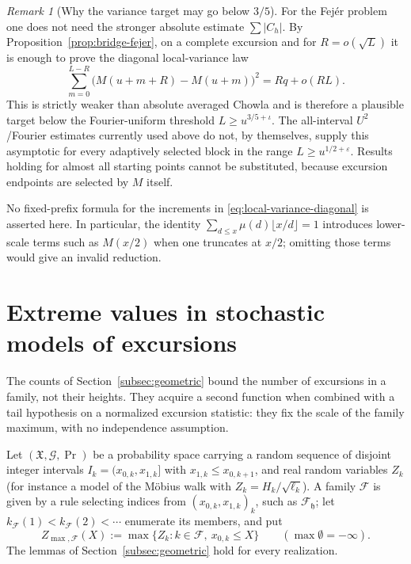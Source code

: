 \documentclass[11pt]{amsart}
\numberwithin{equation}{section}
\theoremstyle{plain}
\theoremstyle{definition}
\theoremstyle{remark}
\newtheorem{remark}[theorem]{Remark}
\newcommand{\eps}{\varepsilon}
\newcommand{\F}{\mathcal{F}}
\begin{document}
\begin{remark}[Why the variance target may go below $3/5$]
\label{rem:variance-target}
For the Fej\'er problem one does not need the stronger absolute estimate
$\sum|C_h|$. By Proposition~\ref{prop:bridge-fejer}, on a complete excursion
and for $R=o(\sqrt L)$ it is enough to prove the diagonal local-variance law
\[
\sum_{m=0}^{L-R}\bigl(M(u+m+R)-M(u+m)\bigr)^2
=Rq+o(RL).
\]
This is strictly weaker than absolute averaged Chowla and is therefore a
plausible target below the Fourier-uniform threshold $L\ge u^{3/5+\iota}$.
The all-interval $U^2$/Fourier estimates currently used above do not, by
themselves, supply this asymptotic for every adaptively selected block in
the range $L\ge u^{1/2+\eps}$. Results holding for almost all starting
points cannot be substituted, because excursion endpoints are selected by
$M$ itself.

No fixed-prefix formula for the increments in
\eqref{eq:local-variance-diagonal} is asserted here. In particular, the
identity $\sum_{d\le x}\mu(d)\lfloor x/d\rfloor=1$ introduces lower-scale
terms such as $M(x/2)$ when one truncates at $x/2$; omitting those terms
would give an invalid reduction.
\end{remark}



\section{Extreme values in stochastic models of excursions}
\label{sec:extreme}
\label{subsec:extreme}

The counts of Section~\ref{subsec:geometric} bound the number of excursions
in a family, not their heights. They acquire a second function when combined
with a tail hypothesis on a normalized excursion statistic: they fix the
scale of the family maximum, with no independence assumption.

Let $(\mathfrak X,\mathcal G,\Pr)$ be a probability space carrying a random
sequence of disjoint integer intervals $I_k=(x_{0,k},x_{1,k}]$ with
$x_{1,k}\le x_{0,k+1}$, and real random variables $Z_k$ (for instance a model
of the M\"obius walk with $Z_k=H_k/\sqrt{\ell_k}$). A family $\F$ is given by
a rule selecting indices from $(x_{0,k},x_{1,k})_k$, such as $\F_{\mathfrak h}$; let
$k_\F(1)<k_\F(2)<\cdots$ enumerate its members, and put
\[
Z_{\max,\F}(X):=\max\{Z_k:k\in\F,\ x_{0,k}\le X\}\qquad(\max\emptyset=-\infty).
\]
The lemmas of Section~\ref{subsec:geometric} hold for every realization.
\end{document}
